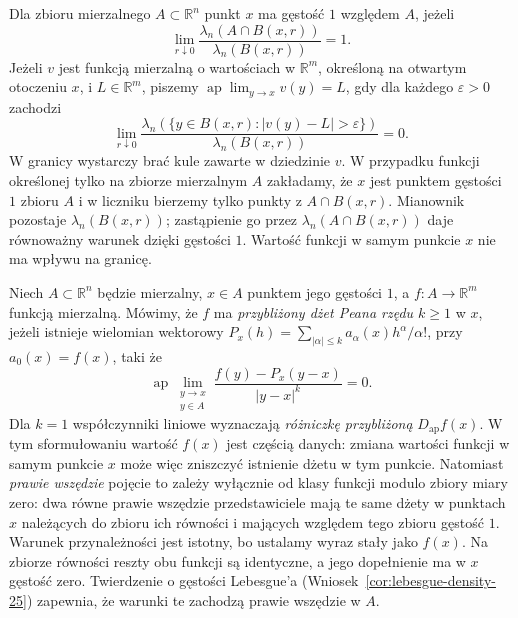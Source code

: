 \begin{definicja}
\label{def:dzety-ap-limit}
Dla zbioru mierzalnego $A\subset\mathbb R^n$ punkt $x$
ma gęstość $1$ względem $A$, jeżeli
\[
 \lim_{r\downarrow0}
 \frac{\lambda_n(A\cap B(x,r))}{\lambda_n(B(x,r))}=1.
\]
Jeżeli $v$ jest funkcją mierzalną o wartościach
w $\mathbb R^m$, określoną na otwartym otoczeniu $x$,
i $L\in\mathbb R^m$, piszemy
$\operatorname{ap}\!\lim_{y\to x}v(y)=L$,
gdy dla każdego $\varepsilon>0$ zachodzi
\[
 \lim_{r\downarrow0}
 \frac{\lambda_n(\{y\in B(x,r):|v(y)-L|>\varepsilon\})}
 {\lambda_n(B(x,r))}=0.
\]
W granicy wystarczy brać kule zawarte w dziedzinie $v$.
W przypadku funkcji określonej tylko na zbiorze mierzalnym
$A$ zakładamy, że $x$ jest punktem gęstości $1$ zbioru $A$
i w liczniku bierzemy tylko punkty z $A\cap B(x,r)$.
Mianownik pozostaje $\lambda_n(B(x,r))$; zastąpienie
go przez $\lambda_n(A\cap B(x,r))$ daje równoważny
warunek dzięki gęstości $1$. Wartość funkcji
w samym punkcie $x$ nie ma wpływu na granicę.
\end{definicja}

\begin{definicja}
\label{def:dzety-approx-jet}
Niech $A\subset\mathbb R^n$ będzie mierzalny,
$x\in A$ punktem jego gęstości $1$, a
$f:A\to\mathbb R^m$ funkcją mierzalną.
Mówimy, że $f$ ma \emph{przybliżony dżet Peana rzędu $k\ge1$}
w $x$, jeżeli istnieje wielomian wektorowy
$P_x(h)=\sum_{|\alpha|\le k}a_\alpha(x)h^\alpha/\alpha!$,
przy $a_0(x)=f(x)$, taki że
\[
 \operatorname{ap}\!\lim_{\substack{y\to x\\y\in A}}
 \frac{f(y)-P_x(y-x)}{|y-x|^k}=0.
\]
Dla $k=1$ współczynniki liniowe wyznaczają
\emph{różniczkę przybliżoną} $D_{\mathrm{ap}}f(x)$.
W tym sformułowaniu wartość $f(x)$ jest częścią danych:
zmiana wartości funkcji w samym punkcie $x$ może więc
zniszczyć istnienie dżetu w tym punkcie. Natomiast
\emph{prawie wszędzie} pojęcie to zależy wyłącznie od
klasy funkcji modulo zbiory miary zero: dwa równe prawie
wszędzie przedstawiciele mają te same dżety w punktach
$x$ należących do zbioru ich równości i mających
względem tego zbioru gęstość $1$. Warunek przynależności
jest istotny, bo ustalamy wyraz stały jako $f(x)$.
Na zbiorze równości reszty obu funkcji są identyczne,
a jego dopełnienie ma w $x$ gęstość zero. Twierdzenie
o gęstości Lebesgue'a (Wniosek~\ref{cor:lebesgue-density-25})
zapewnia, że warunki te zachodzą prawie wszędzie w $A$.
\end{definicja}

